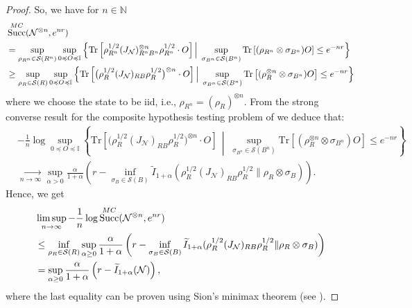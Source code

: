 \documentclass[a4paper,onecolumn,11pt,accepted=2025-10-01]{quantumarticle}
\DeclareMathOperator{\suc}{Succ}
\newcommand*{\dI}{\mathbb{I}}
\newcommand*{\cN}{\mathcal{N}}
\newcommand*{\cS}{\mathcal{S}}
\newcommand*{\tr}[1]{\mathrm{Tr}\left[#1\right]}
\newcommand*{\mle}{\preccurlyeq}
\begin{document}
\begin{proof}
So, we have for $n\in \mathbb{N}$
\begin{align}
&\suc^{\rm{MC}}(\cN^{\otimes n}, e^{nr}) \notag 
\\&= \sup_{\rho_{R^n} \in \cS(R^n)} \sup_{0 \mle O \mle \dI} \Big\{ 
\tr{\rho_{R^n}^{1/2} (J_{\cN})_{R^n B^n}^{\otimes n} \rho_{R^n}^{1/2} \cdot O} \Big|\;  \sup_{\sigma_{B^n} \in \cS(B^n)} \tr{(\rho_{R^n} \otimes \sigma_{B^n}) O} \le e^{-nr} \Big\} \notag \\
&\ge \sup_{\rho_R \in \cS(R)} \sup_{0 \mle O \mle \dI} \Big\{ 
\tr{\big(\rho_R^{1/2} (J_{\cN})_{RB} \rho_R^{1/2}\big)^{\otimes n} \cdot O} \Big|\; \sup_{\sigma_{B^n} \in \cS(B^n)} \tr{(\rho_R^{\otimes n} \otimes \sigma_{B^n}) O} \le e^{-nr} \Big\}
\end{align}
where we choose the state to be iid, i.e., $\rho_{R^n} = (\rho_R)^{\otimes n}$. From  the strong converse result for the composite hypothesis testing problem of \cite[Theorem 14]{Hayashi2016Oct} we deduce that:
\begin{align}
  & -\frac{1}{n} \log\sup_{0\mle O\mle \dI} \left\{\tr{ \big(\rho_R^{1/2} ( J_{\cN})_{RB}\rho_R^{1/2}\big)^{\otimes n} \cdot O}  \,\middle| \;  \sup_{\sigma_{B^n}\in \cS(B^n)}\tr{(\rho_R^{\otimes n}\otimes \sigma_{B^n}) O}\le e^{-nr} \right\} 
   \\&\underset{n\rightarrow \infty}{\longrightarrow} \sup_{\alpha>0} \frac{\alpha}{1+\alpha}  \left( r - \inf_{\sigma_B \in \cS(B)}\widetilde{I}_{1+\alpha}(\rho_R^{1/2} ( J_{\cN})_{RB}\rho_R^{1/2} \| \rho_R \otimes \sigma_B)\right).
\end{align}
Hence, we get 
\begin{align}
   & \limsup_{n\rightarrow \infty} -\frac{1}{n}\log\suc_{}^{\rm{MC}}(\cN^{\otimes n},e^{nr}) 
   \\&\le \inf_{\rho_{R}\in \cS(R)} \sup_{\alpha\ge 0} \frac{\alpha}{1+\alpha}  \left( r - \inf_{\sigma_B \in \cS(B)}\widetilde{I}_{1+\alpha}(\rho_R^{1/2} ( J_{\cN})_{RB}\rho_R^{1/2} \| \rho_R \otimes \sigma_B)\right)
       \\&= \sup_{\alpha\ge 0} \frac{\alpha}{1+\alpha}  \left( r -\widetilde{I}_{1+\alpha}(\cN)\right),
\end{align}
where the last equality can be proven using Sion's minimax theorem (see \cite[Eqs.~(100)--(102)]{Li2023Nov}).


\end{proof}
\end{document}
